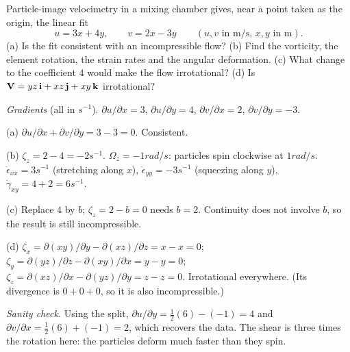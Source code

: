 \begin{example}
Particle-image velocimetry in a mixing chamber gives, near a point taken as the origin, the linear fit
\[
u = 3x + 4y, \qquad v = 2x - 3y \qquad (u, v \text{ in m/s, } x, y \text{ in m}).
\]
(a) Is the fit consistent with an incompressible flow? (b) Find the vorticity, the element rotation, the strain rates and the angular deformation. (c) What change to the coefficient $4$ would make the flow irrotational? (d) Is $\mathbf{V} = yz\,\mathbf{i} + xz\,\mathbf{j} + xy\,\mathbf{k}$ irrotational?

\emph{Gradients} (all in $\unit{s^{-1}}$). $\partial u/\partial x = 3$, $\partial u/\partial y = 4$, $\partial v/\partial x = 2$, $\partial v/\partial y = -3$.

(a) $\partial u/\partial x + \partial v/\partial y = 3 - 3 = 0$. Consistent.

(b) $\zeta_z = 2 - 4 = -2\unit{s^{-1}}$. $\Omega_z = -1\unit{rad/s}$: particles spin clockwise at $1\unit{rad/s}$. $\dot\epsilon_{xx} = 3\unit{s^{-1}}$ (stretching along $x$), $\dot\epsilon_{yy} = -3\unit{s^{-1}}$ (squeezing along $y$), $\dot\gamma_{xy} = 4 + 2 = 6\unit{s^{-1}}$.

(c) Replace $4$ by $b$; $\zeta_z = 2 - b = 0$ needs $b = 2$. Continuity does not involve $b$, so the result is still incompressible.

(d) $\zeta_x = \partial(xy)/\partial y - \partial(xz)/\partial z = x - x = 0$; $\zeta_y = \partial(yz)/\partial z - \partial(xy)/\partial x = y - y = 0$; $\zeta_z = \partial(xz)/\partial x - \partial(yz)/\partial y = z - z = 0$. Irrotational everywhere. (Its divergence is $0 + 0 + 0$, so it is also incompressible.)

\emph{Sanity check.} Using the split, $\partial u/\partial y = \frac12(6) - (-1) = 4$ and $\partial v/\partial x = \frac12(6) + (-1) = 2$, which recovers the data. The shear is three times the rotation here: the particles deform much faster than they spin.
\end{example}

